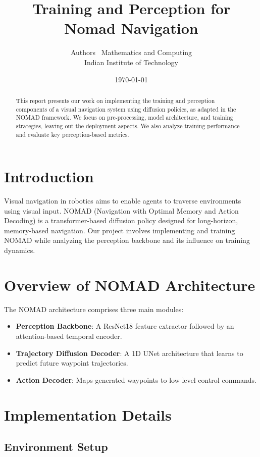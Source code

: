 \documentclass[12pt]{article}
\title{Training and Perception for Nomad Navigation}
\author{Authors \ Mathematics and Computing \\ Indian Institute of Technology}
\date{\today}
\begin{document}
\maketitle

\begin{abstract}
This report presents our work on implementing the training and perception components of a visual navigation system using diffusion policies, as adapted in the NOMAD framework. We focus on pre-processing, model architecture, and training strategies, leaving out the deployment aspects. We also analyze training performance and evaluate key perception-based metrics.
\end{abstract}

\section{Introduction}
Visual navigation in robotics aims to enable agents to traverse environments using visual input. NOMAD (Navigation with Optimal Memory and Action Decoding) is a transformer-based diffusion policy designed for long-horizon, memory-based navigation. Our project involves implementing and training NOMAD while analyzing the perception backbone and its influence on training dynamics.

\section{Overview of NOMAD Architecture}
The NOMAD architecture comprises three main modules:
\begin{itemize}
\item \textbf{Perception Backbone}: A ResNet18 feature extractor followed by an attention-based temporal encoder.
\item \textbf{Trajectory Diffusion Decoder}: A 1D UNet architecture that learns to predict future waypoint trajectories.
\item \textbf{Action Decoder}: Maps generated waypoints to low-level control commands.
\end{itemize}

\section{Implementation Details}
\subsection{Environment Setup}
\end{document}
